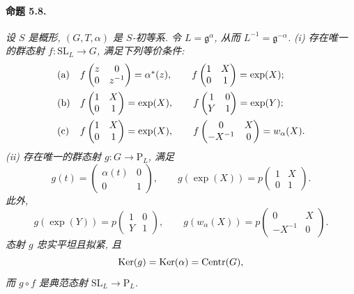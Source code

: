 \paragraph{\textbf{命题 5.8.}}
\emph{设 \(S\) 是概形, \((G,T,\alpha)\) 是 \(S\)-初等系. 令 \(L=\mathfrak g^\alpha\), 从而 \(L^{-1}=\mathfrak g^{-\alpha}\).}
\emph{\textup{(i)} 存在唯一的群态射 \(f\colon\mathrm{SL}_L\to G\), 满足下列等价条件:}
\[
\begin{array}{ll}
\textup{(a)}
&
f\begin{pmatrix}z&0\\0&z^{-1}\end{pmatrix}=\alpha^\ast(z),
\qquad
f\begin{pmatrix}1&X\\0&1\end{pmatrix}=\exp(X);
\\[1.1em]
\textup{(b)}
&
f\begin{pmatrix}1&X\\0&1\end{pmatrix}=\exp(X),
\qquad
f\begin{pmatrix}1&0\\Y&1\end{pmatrix}=\exp(Y);
\\[1.1em]
\textup{(c)}
&
f\begin{pmatrix}1&X\\0&1\end{pmatrix}=\exp(X),
\qquad
f\begin{pmatrix}0&X\\-X^{-1}&0\end{pmatrix}=w_\alpha(X).
\end{array}
\]
\emph{\textup{(ii)} 存在唯一的群态射 \(g\colon G\to\mathrm P_L\), 满足}
\[
 g(t)=
 \begin{pmatrix}\alpha(t)&0\\0&1\end{pmatrix},
 \qquad
 g(\exp(X))
 =p\begin{pmatrix}1&X\\0&1\end{pmatrix}.
\]
\emph{此外,}
\[
 g(\exp(Y))
 =p\begin{pmatrix}1&0\\Y&1\end{pmatrix},
 \qquad
 g(w_\alpha(X))
 =p\begin{pmatrix}0&X\\-X^{-1}&0\end{pmatrix}.
\]
\emph{态射 \(g\) 忠实平坦且拟紧, 且}
\[
 \operatorname{Ker}(g)=\operatorname{Ker}(\alpha)=\operatorname{Centr}(G),
\]
\emph{而 \(g\circ f\) 是典范态射 \(\mathrm{SL}_L\to\mathrm P_L\).}

